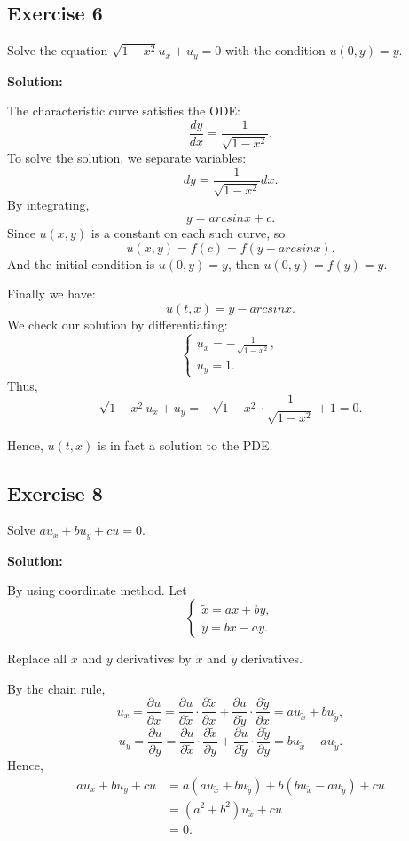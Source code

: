 \documentclass{article}
\begin{document}
    \subsection{Exercise 6}
	Solve the equation $\sqrt{1-x^2}u_x+u_y=0$ with the condition $u(0, y)=y.$
		
	\textbf{Solution:}

	    The characteristic curve satisfies the ODE:
            \[ \frac{dy}{dx}=\frac{1}{\sqrt{1-x^2}}.\]
			To solve the solution, we separate variables: 		
			\[ dy=\frac{1}{\sqrt{1-x^2}}dx.\]
			By integrating, \[y= arcsinx + c .\]
			Since $u(x,y)$ is a constant on each such curve, so
			\[ u(x,y)=f(c)=f(y - arcsinx).\]
			And the initial condition is $u(0,y)=y$, then $u(0,y)=f(y)=y.$

			Finally we have:
			\[u(t,x)=y - arcsinx.\]
			We check our solution by differentiating:
			\begin{equation*}
				\begin{cases}
					u_x=-\frac{1}{\sqrt{1-x^2}},
					\\
					u_y=1.
				\end{cases}
			\end{equation*}
			Thus, \[\sqrt{1-x^2}u_x+u_y=-\sqrt{1-x^2} \cdot \frac{1}{\sqrt{1-x^2}}+1=0.\]

			Hence, $u(t,x)$ is in fact a solution to the PDE.


		\subsection{Exercise 8}
		Solve $au_x+bu_y+cu=0.$
		
		\textbf{Solution:}

		By using coordinate method. Let 
		\begin{equation*}
			\begin{cases}
				\tilde{x}=ax+by, \\
				\tilde{y}=bx-ay.
			\end{cases}
		\end{equation*}

		Replace all $x$ and $y$ derivatives by $\tilde{x}$ and $\tilde{y}$ derivatives.

		By the chain rule, \[u_x=\frac{\partial u}{\partial x}=\frac{\partial u}{\partial \tilde{x}}\cdot\frac{\partial \tilde{x}}{\partial x}+\frac{\partial u}{\partial \tilde{y}}\cdot\frac{\partial \tilde{y}}{\partial x}=au_{\tilde{x}}+bu_{\tilde{y}},\]
		\[u_y=\frac{\partial u}{\partial y}=\frac{\partial u}{\partial \tilde{x}}\cdot\frac{\partial \tilde{x}}{\partial y}+\frac{\partial u}{\partial \tilde{y}}\cdot\frac{\partial \tilde{y}}{\partial y}=bu_{\tilde{x}}-au_{\tilde{y}}.\]
		Hence,
		\begin{equation*}
			\begin{aligned}
			au_x+bu_y+cu&=
			a\left(au_{\tilde{x}}+bu_{\tilde{y}} \right)+b\left(bu_{\tilde{x}}-au_{\tilde{y}}\right) +cu\\
			&=\left(a^2+b^2\right)u_{\tilde{x}}+cu\\
			&=0.
			\end{aligned}
		\end{equation*}
\end{document}
